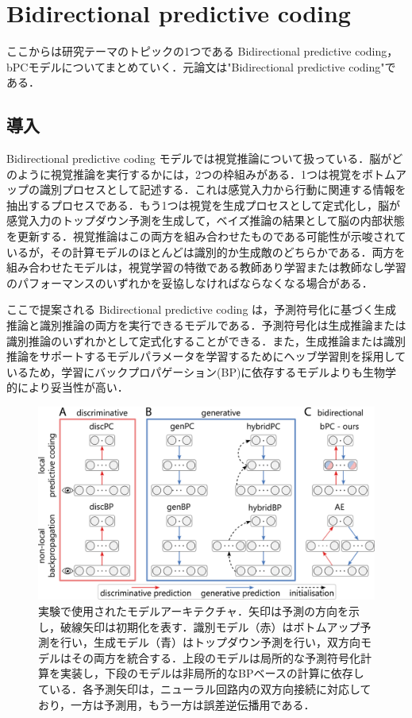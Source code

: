 \documentclass[a4paper, titlepage]{jsarticle}
\begin{document}
\section{Bidirectional predictive coding}
ここからは研究テーマのトピックの1つである Bidirectional predictive coding，bPCモデルについてまとめていく．元論文は"Bidirectional predictive coding"である．
\subsection{導入}
Bidirectional predictive coding モデルでは視覚推論について扱っている．脳がどのように視覚推論を実行するかには，2つの枠組みがある．1つは視覚をボトムアップの識別プロセスとして記述する．これは感覚入力から行動に関連する情報を抽出するプロセスである．もう1つは視覚を生成プロセスとして定式化し，脳が感覚入力のトップダウン予測を生成して，ベイズ推論の結果として脳の内部状態を更新する．視覚推論はこの両方を組み合わせたものである可能性が示唆されているが，その計算モデルのほとんどは識別的か生成敵のどちらかである．両方を組み合わせたモデルは，視覚学習の特徴である教師あり学習または教師なし学習のパフォーマンスのいずれかを妥協しなければならなくなる場合がある．
\par
ここで提案される Bidirectional predictive coding は，予測符号化に基づく生成推論と識別推論の両方を実行できるモデルである．予測符号化は生成推論または識別推論のいずれかとして定式化することができる．また，生成推論または識別推論をサポートするモデルパラメータを学習するためにヘッブ学習則を採用しているため，学習にバックプロパゲーション(BP)に依存するモデルよりも生物学的により妥当性が高い．
\begin{figure}[htbp]
   \centering
   \includegraphics[scale=0.26]{bPC_relatedmodels.png}
   \caption{実験で使用されたモデルアーキテクチャ．矢印は予測の方向を示し，破線矢印は初期化を表す．識別モデル（赤）はボトムアップ予測を行い，生成モデル（青）はトップダウン予測を行い，双方向モデルはその両方を統合する．上段のモデルは局所的な予測符号化計算を実装し，下段のモデルは非局所的なBPベースの計算に依存している．各予測矢印は，ニューラル回路内の双方向接続に対応しており，一方は予測用，もう一方は誤差逆伝播用である．}
   \label{related_models}
\end{figure}
\end{document}
